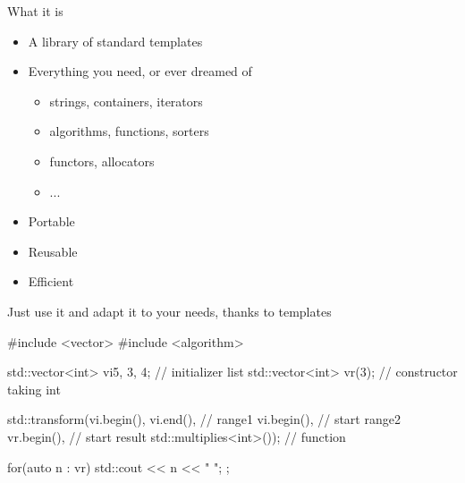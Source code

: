 \begin{frame}[fragile]
  \begin{block}{What it is}
    \begin{itemize}
    \item A library of standard templates
    \item Everything you need, or ever dreamed of
      \begin{itemize}
      \item strings, containers, iterators
      \item algorithms, functions, sorters
      \item functors, allocators
      \item ...
      \end{itemize}
    \item Portable
    \item Reusable
    \item Efficient
    \end{itemize}
  \end{block}
  \pause
  \begin{alertblock}{Just use it}
    and adapt it to your needs, thanks to templates
  \end{alertblock}
\end{frame}

\begin{frame}[fragile,label=STLcode]
  \begin{cppcode*}{}
    #include <vector>
    #include <algorithm>

    std::vector<int> vi{5, 3, 4}; // initializer list
    std::vector<int> vr(3); // constructor taking int

    std::transform(vi.begin(), vi.end(),      // range1
                   vi.begin(),          // start range2
                   vr.begin(),          // start result
                   std::multiplies<int>()); // function

    for(auto n : vr) {
      std::cout << n << " ";
    };
  \end{cppcode*}
\end{frame}

